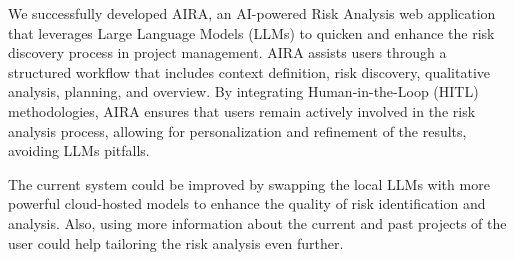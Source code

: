 We successfully developed AIRA, an AI-powered
Risk Analysis web application that leverages Large Language
Models (LLMs) to quicken and enhance the risk discovery
process in project management. AIRA assists users through
a structured workflow that includes context definition,
risk discovery, qualitative analysis, planning, and
overview. By integrating Human-in-the-Loop (HITL)
methodologies, AIRA ensures that users remain actively
involved in the risk analysis process, allowing for
personalization and refinement of the results, avoiding
LLMs pitfalls.

The current system could be improved by swapping the
local LLMs with more powerful cloud-hosted models to
enhance the quality of risk identification and analysis.
Also, using more information about the current and 
past projects of the user could help tailoring the
risk analysis even further.